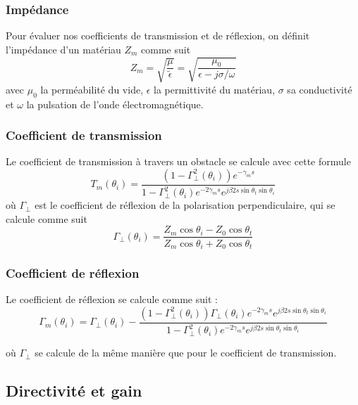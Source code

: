 \subsubsection*{Imp{\'e}dance}

Pour {\'e}valuer nos coefficients de transmission et de r{\'e}flexion, on
d{\'e}finit l'imp{\'e}dance d'un mat{\'e}riau $Z_m$ comme suit
\[ Z_m = \sqrt{\frac{\mu}{\tilde{\epsilon}}} = \sqrt{\frac{\mu_0}{\epsilon - j
   \sigma / \omega}} \]
avec $\mu_0$ la perm{\'e}abilit{\'e} du vide, $\epsilon$ la permittivit{\'e}
du mat{\'e}riau, $\sigma$ sa conductivit{\'e} et $\omega$ la pulsation de
l'onde {\'e}lectromagn{\'e}tique.

\subsubsection*{Coefficient de transmission}

Le coefficient de transmission {\`a} travers un obstacle se calcule avec cette
formule
\[ T_m (\theta_i) = \frac{(1 - \Gamma_{\perp}^2 (\theta_i)) e^{- \gamma_m
   s}}{1 - \Gamma_{\perp}^2 (\theta_i) e^{- 2 \gamma_m s} e^{j \beta 2 s \sin
   \theta_t \sin \theta_i}} \]
o{\`u} $\Gamma_{\perp}$ est le coefficient de r{\'e}flexion de la polarisation
perpendiculaire, qui se calcule comme suit
\[ \Gamma_{\perp} (\theta_i) = \frac{Z_m \cos \theta_i - Z_0 \cos
   \theta_t}{Z_m \cos \theta_i + Z_0 \cos \theta_t} \]

\subsubsection*{Coefficient de r{\'e}flexion}

Le coefficient de r{\'e}flexion se calcule comme suit :
\[ \Gamma_m (\theta_i) = \Gamma_{\perp} (\theta_i) - \frac{(1 -
   \Gamma_{\perp}^2 (\theta_i)) \Gamma_{\perp} (\theta_i) e^{- 2 \gamma_m s}
   e^{j \beta 2 s \sin \theta_t \sin \theta_i}}{1 - \Gamma_{\perp}^2
   (\theta_i) e^{- 2 \gamma_m s} e^{j \beta 2 s \sin \theta_t \sin \theta_i}}
\]


o{\`u} $\Gamma_{\perp}$ se calcule de la m{\^e}me mani{\`e}re que pour le
coefficient de transmission.
\subsection{Directivit{\'e} et gain}

